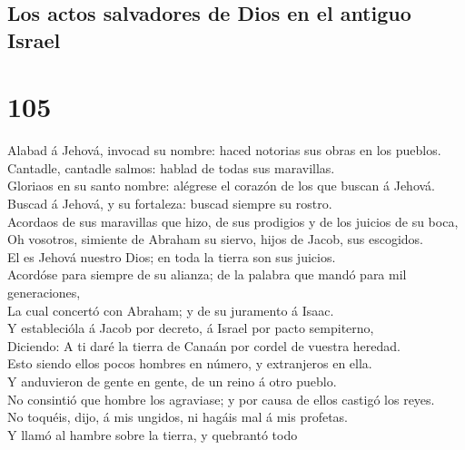 \hypertarget{los-actos-salvadores-de-dios-en-el-antiguo-israel}{%
\subsection{Los actos salvadores de Dios en el antiguo
Israel}\label{los-actos-salvadores-de-dios-en-el-antiguo-israel}}

\hypertarget{section-19-105}{%
\section{105}\label{section-19-105}}

 Alabad á Jehová, invocad su nombre: haced notorias sus
obras en los pueblos.\\
 Cantadle, cantadle salmos: hablad de todas sus
maravillas.\\
 Gloriaos en su santo nombre: alégrese el corazón de los
que buscan á Jehová.\\
 Buscad á Jehová, y su fortaleza: buscad siempre su
rostro.\\
 Acordaos de sus maravillas que hizo, de sus prodigios y
de los juicios de su boca,\\
 Oh vosotros, simiente de Abraham su siervo, hijos de
Jacob, sus escogidos.\\
 El es Jehová nuestro Dios; en toda la tierra son sus
juicios.\\
 Acordóse para siempre de su alianza; de la palabra que
mandó para mil generaciones,\\
 La cual concertó con Abraham; y de su juramento á
Isaac.\\
 Y establecióla á Jacob por decreto, á Israel por pacto
sempiterno,\\
 Diciendo: A ti daré la tierra de Canaán por cordel de
vuestra heredad.\\
 Esto siendo ellos pocos hombres en número, y extranjeros
en ella.\\
 Y anduvieron de gente en gente, de un reino á otro
pueblo.\\
 No consintió que hombre los agraviase; y por causa de
ellos castigó los reyes.\\
 No toquéis, dijo, á mis ungidos, ni hagáis mal á mis
profetas.\\
 Y llamó al hambre sobre la tierra, y quebrantó todo
